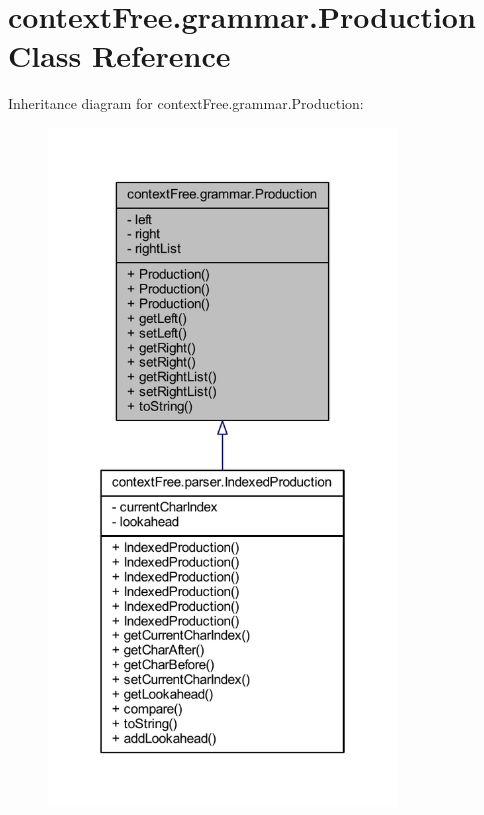\hypertarget{classcontext_free_1_1grammar_1_1_production}{\section{context\-Free.\-grammar.\-Production Class Reference}
\label{classcontext_free_1_1grammar_1_1_production}
}


Inheritance diagram for context\-Free.\-grammar.\-Production\-:
\nopagebreak
\begin{figure}[H]
\begin{center}
\leavevmode
\includegraphics[width=262pt]{classcontext_free_1_1grammar_1_1_production__inherit__graph}
\end{center}
\end{figure}


